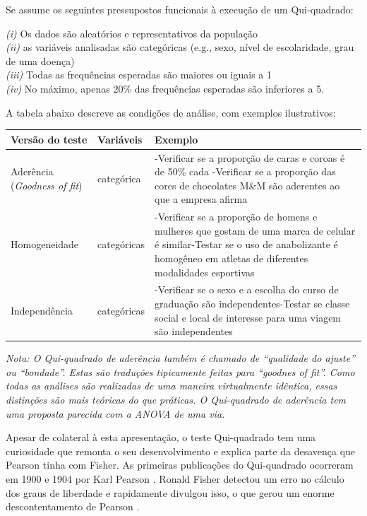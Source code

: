 \documentclass[
]{book}
\begin{document}
Se assume os seguintes pressupostos funcionais à execução de um Qui-quadrado:

\emph{(i)} Os dados são aleatórios e representativos da população\\
\emph{(ii)} as variáveis analisadas são categóricas (e.g., sexo, nível de escolaridade, grau de uma doença)\\
\emph{(iii)} Todas as frequências esperadas são maiores ou iguais a 1\\
\emph{(iv)} No máximo, apenas 20\% das frequências esperadas são inferiores a 5.

A tabela abaixo descreve as condições de análise, com exemplos ilustrativos:

\begin{longtable}[]{@{}
  >{\raggedright\arraybackslash}p{}
  >{\raggedright\arraybackslash}p{}
  >{\raggedright\arraybackslash}p{}@{}}
\toprule
Versão do teste & Variáveis & Exemplo \\
\midrule
\endhead
Aderência (\emph{Goodness of fit}) & 1 categórica & -Verificar se a proporção de caras e coroas é de 50\% cada -Verificar se a proporção das cores de chocolates M\&M são aderentes ao que a empresa afirma \\
Homogeneidade & 2 categóricas & -Verificar se a proporção de homens e mulheres que gostam de uma marca de celular é similar-Testar se o uso de anabolizante é homogêneo em atletas de diferentes modalidades esportivas \\
Independência & 2 categóricas & -Verificar se o sexo e a escolha do curso de graduação são independentes-Testar se classe social e local de interesse para uma viagem são independentes \\
\bottomrule
\end{longtable}

\emph{Nota: O Qui-quadrado de aderência também é chamado de ``qualidade do ajuste'' ou ``bondade''. Estas são traduções tipicamente feitas para ``goodnes of fit''. Como todas as análises são realizadas de uma maneira virtualmente idêntica, essas distinções são mais teóricas do que práticas. O Qui-quadrado de aderência tem uma proposta parecida com a ANOVA de uma via.}

Apesar de colateral à esta apresentação, o teste Qui-quadrado tem uma curiosidade que remonta o seu desenvolvimento e explica parte da desavença que Pearson tinha com Fisher. As primeiras publicações do Qui-quadrado ocorreram em 1900 e 1904 por Karl Pearson \citep{Pearson1900}. Ronald Fisher detectou um erro no cálculo dos graus de liberdade e rapidamente divulgou isso, o que gerou um enorme descontentamento de Pearson \citep{BAIRD1983}.
\end{document}
